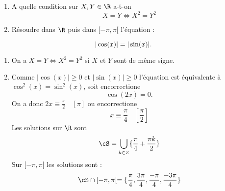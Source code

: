 



\begin{exercice}
\begin{enumerate}
\item A quelle condition sur $X,Y\in \R$ a-t-on 
$$X=Y \Longleftrightarrow X^2=Y^2  $$
\item Résoudre dans $\R$ puis dans $[-\pi, \pi[$ l'équation :
\end{enumerate}


\begin{equation}
|\cos(x)|=|\sin(x)|.\\
\end{equation}

\end{exercice}

\begin{correction}
\begin{enumerate}
\item On a  $X=Y \Longleftrightarrow X^2=Y^2  $ si $X$ et $Y$ sont de même signe.
\item Comme $|\cos(x)|\geq 0$ et $|\sin(x)|\geq 0$ l'équation est équivalente à $\cos^2(x) =\sin^2(x)$, soit encorrectione 
$$\cos(2x)=0.$$
On a donc $2x\equiv \frac{\pi}{2}\quad [\pi]$ ou encorrectione 
$$x\equiv \frac{\pi}{4}\quad [\frac{\pi}{2}]$$
 Les solutions sur $\R$ sont 
 $$\cS =\bigcup_{k\in Z} \{ \frac{\pi}{4}+\frac{\pi k}{2}\}$$
 Sur $[-\pi, \pi[$  les solutions sont :
 $$\cS\cap [-\pi, \pi[ =  \{ \frac{\pi}{4}, \frac{3\pi}{4}, \frac{-\pi}{4}, \frac{-3\pi}{4}\}$$
 




\end{enumerate}
\end{correction}